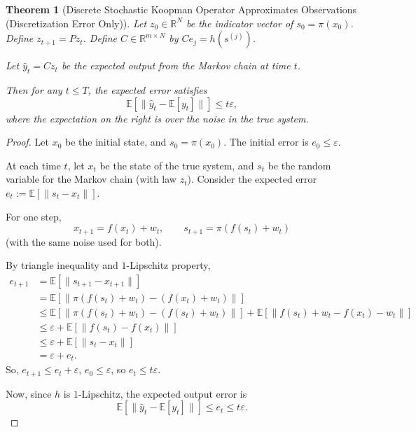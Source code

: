 \documentclass[11pt]{article}
\def\epsilon{\varepsilon}
\newtheorem{theorem}{Theorem}[section]
\numberwithin{equation}{section}
\begin{document}
{{\begin{theorem}[Discrete Stochastic Koopman Operator Approximates Observations (Discretization Error Only)]
Let $z_0 \in \mathbb{R}^N$ be the indicator vector of $s_0 = \pi(x_0)$. Define $z_{t+1} = P z_t$. Define $C \in \mathbb{R}^{m \times N}$ by $C e_j = h(s^{(j)})$.

Let $\hat{y}_t = C z_t$ be the expected output from the Markov chain at time $t$.

Then for any $t \leq T$, the expected error satisfies
\[
\mathbb{E} \left[ \|\hat{y}_t - \mathbb{E}[y_t] \| \right] \leq t\epsilon,
\]
where the expectation on the right is over the noise in the true system.
\end{theorem}

\begin{proof}
Let $x_0$ be the initial state, and $s_0 = \pi(x_0)$. The initial error is $e_0 \leq \epsilon$.

At each time $t$, let $x_t$ be the state of the true system, and $s_t$ be the random variable for the Markov chain (with law $z_t$). Consider the expected error $e_t := \mathbb{E}[ \| s_t - x_t \| ]$.

For one step,
\[
x_{t+1} = f(x_t) + w_t, \qquad s_{t+1} = \pi( f(s_t) + w_t )
\]
(with the same noise used for both).

By triangle inequality and $1$-Lipschitz property,
\begin{align*}
e_{t+1} &= \mathbb{E}[ \| s_{t+1} - x_{t+1} \| ] \\
&= \mathbb{E}[ \| \pi(f(s_t) + w_t) - (f(x_t) + w_t) \| ] \\
&\leq \mathbb{E}[ \| \pi(f(s_t) + w_t) - (f(s_t) + w_t) \| ] + \mathbb{E}[ \| f(s_t) + w_t - f(x_t) - w_t \| ] \\
&\leq \epsilon + \mathbb{E}[ \| f(s_t) - f(x_t) \| ] \\
&\leq \epsilon + \mathbb{E}[ \| s_t - x_t \| ] \\
&= \epsilon + e_t.
\end{align*}
So, $e_{t+1} \leq e_t + \epsilon$, $e_0 \leq \epsilon$, so $e_t \leq t\epsilon$.

Now, since $h$ is $1$-Lipschitz, the expected output error is
\[
\mathbb{E}[ \| \hat{y}_t - \mathbb{E}[y_t] \| ] \leq e_t \leq t\epsilon.
\]
\end{proof}

}}
\end{document}
